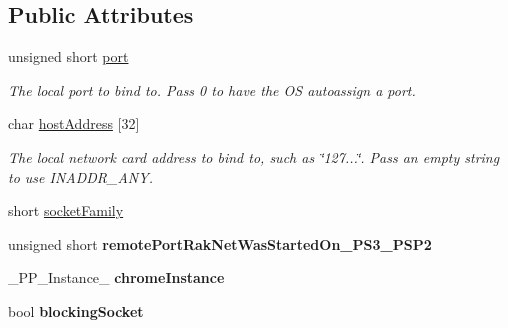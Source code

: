 \subsection*{Public Attributes}
\begin{DoxyCompactItemize}
\item 
\hypertarget{struct_rak_net_1_1_socket_descriptor_a6c1c16e08458b57e09ebb277fdd07c64}{unsigned short \hyperlink{struct_rak_net_1_1_socket_descriptor_a6c1c16e08458b57e09ebb277fdd07c64}{port}}\label{struct_rak_net_1_1_socket_descriptor_a6c1c16e08458b57e09ebb277fdd07c64}

\begin{DoxyCompactList}\small\item\em The local port to bind to. Pass 0 to have the O\-S autoassign a port. \end{DoxyCompactList}\item 
\hypertarget{struct_rak_net_1_1_socket_descriptor_aad9bcadcdd184ccab058d5f960d5f0ee}{char \hyperlink{struct_rak_net_1_1_socket_descriptor_aad9bcadcdd184ccab058d5f960d5f0ee}{host\-Address} \mbox{[}32\mbox{]}}\label{struct_rak_net_1_1_socket_descriptor_aad9bcadcdd184ccab058d5f960d5f0ee}

\begin{DoxyCompactList}\small\item\em The local network card address to bind to, such as \char`\"{}127...\char`\"{}. Pass an empty string to use I\-N\-A\-D\-D\-R\-\_\-\-A\-N\-Y. \end{DoxyCompactList}\item 
short \hyperlink{struct_rak_net_1_1_socket_descriptor_a5d55b4ee9ae18d738ed6066198205a21}{socket\-Family}
\item 
\hypertarget{struct_rak_net_1_1_socket_descriptor_a1306ebc8df36e11e7ac803f984dd65e6}{unsigned short {\bfseries remote\-Port\-Rak\-Net\-Was\-Started\-On\-\_\-\-P\-S3\-\_\-\-P\-S\-P2}}\label{struct_rak_net_1_1_socket_descriptor_a1306ebc8df36e11e7ac803f984dd65e6}

\item 
\hypertarget{struct_rak_net_1_1_socket_descriptor_a4f7dfbdc397bbf457ad3abf0beb67094}{\-\_\-\-P\-P\-\_\-\-Instance\-\_\- {\bfseries chrome\-Instance}}\label{struct_rak_net_1_1_socket_descriptor_a4f7dfbdc397bbf457ad3abf0beb67094}

\item 
\hypertarget{struct_rak_net_1_1_socket_descriptor_abe944073182d0531ec5d987cfac9f1a1}{bool {\bfseries blocking\-Socket}}\label{struct_rak_net_1_1_socket_descriptor_abe944073182d0531ec5d987cfac9f1a1}


\end{DoxyCompactItemize}

